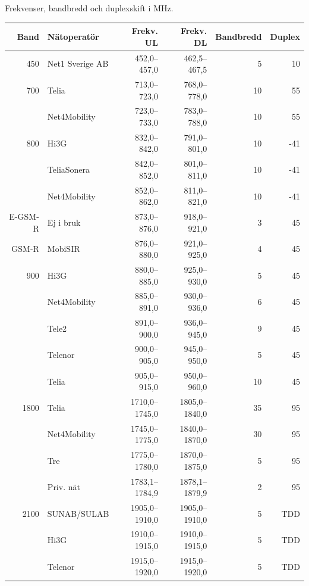 {Frekvenser, bandbredd och duplexskift i MHz.

\begin{longtable}{rlrrrr}
	    \bf Band & \bf Nätoperatör    & \bf Frekv. UL & \bf Frekv. DL & \bf Bandbredd & \bf Duplex \\ \hline
	    \endhead

450     & Net1 Sverige AB & 452,0--457,0   & 462,5--467,5   & 5   & 10  \\ \hline
700     & Telia           & 713,0--723,0   & 768,0--778,0   & 10  & 55  \\
        & Net4Mobility    & 723,0--733,0   & 783,0--788,0   & 10  & 55  \\ \hline
800     & Hi3G            & 832,0--842,0   & 791,0--801,0   & 10  & -41 \\
        & TeliaSonera     & 842,0--852,0   & 801,0--811,0   & 10  & -41 \\
        & Net4Mobility    & 852,0--862,0   & 811,0--821,0   & 10  & -41 \\ \hline
E-GSM-R & Ej i bruk       & 873,0--876,0   & 918,0--921,0   & 3   & 45  \\
GSM-R   & MobiSIR         & 876,0--880,0   & 921,0--925,0   & 4   & 45  \\ \hline
900     & Hi3G            & 880,0--885,0   & 925,0--930,0   & 5   & 45  \\
        & Net4Mobility    & 885,0--891,0   & 930,0--936,0   & 6   & 45  \\
        & Tele2           & 891,0--900,0   & 936,0--945,0   & 9   & 45  \\
        & Telenor         & 900,0--905,0   & 945,0--950,0   & 5   & 45  \\
        & Telia           & 905,0--915,0   & 950,0--960,0   & 10  & 45  \\ \hline
1800    & Telia           & 1710,0--1745,0 & 1805,0--1840,0 & 35  & 95  \\
        & Net4Mobility    & 1745,0--1775,0 & 1840,0--1870,0 & 30  & 95  \\
        & Tre             & 1775,0--1780,0 & 1870,0--1875,0 & 5   & 95  \\
        & Priv. nät       & 1783,1--1784,9 & 1878,1--1879,9 & 2   & 95  \\ \hline
2100    & SUNAB/SULAB     & 1905,0--1910,0 & 1905,0--1910,0 & 5   & TDD \\
        & Hi3G            & 1910,0--1915,0 & 1910,0--1915,0 & 5   & TDD \\
        & Telenor         & 1915,0--1920,0 & 1915,0--1920,0 & 5   & TDD \\

\end{longtable}}

